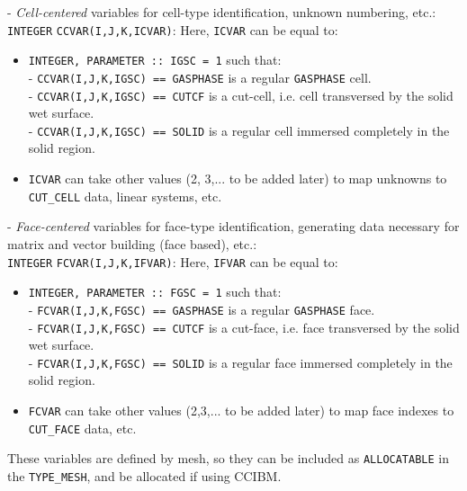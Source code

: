 \documentclass[12pt]{article}
\begin{document}
- \textit{Cell-centered} variables for cell-type identification, unknown numbering, etc.:  \\
 \texttt{INTEGER} \texttt{CCVAR(I,J,K,ICVAR)}: Here,  \texttt{ICVAR} can be equal to:   \\
%
\begin{itemize}

  \item \texttt{INTEGER, PARAMETER :: IGSC = 1} such that: \\
           - \texttt{CCVAR(I,J,K,IGSC) == GASPHASE} is a regular \texttt{GASPHASE} cell. \\
           - \texttt{CCVAR(I,J,K,IGSC) == CUTCF} is a cut-cell, i.e. cell transversed by the solid wet surface. \\
           - \texttt{CCVAR(I,J,K,IGSC) == SOLID} is a regular cell immersed completely in the solid region.

  \item \texttt{ICVAR} can take other values (2, 3,... to be added later) to map unknowns to \texttt{CUT\_CELL} data, linear systems, etc.


\end{itemize}
%
- \textit{Face-centered} variables for face-type identification, generating data necessary for matrix and vector building (face based),  etc.:  \\
\texttt{INTEGER} \texttt{FCVAR(I,J,K,IFVAR)}: Here,  \texttt{IFVAR} can be equal to:   \\
%
\begin{itemize}

  \item \texttt{INTEGER, PARAMETER :: FGSC = 1} such that: \\
           - \texttt{FCVAR(I,J,K,FGSC) == GASPHASE} is a regular \texttt{GASPHASE} face. \\
           - \texttt{FCVAR(I,J,K,FGSC) == CUTCF} is a cut-face, i.e. face transversed by the solid wet surface. \\
           - \texttt{FCVAR(I,J,K,FGSC) == SOLID} is a regular face immersed completely in the solid region.

  \item \texttt{FCVAR} can take other values (2,3,... to be added later) to map face indexes to \texttt{CUT\_FACE} data, etc.


\end{itemize}
%
These variables are defined by mesh, so they can be included as \texttt{ALLOCATABLE} in the \texttt{TYPE\_MESH}, and be allocated if using CCIBM.
\end{document}

